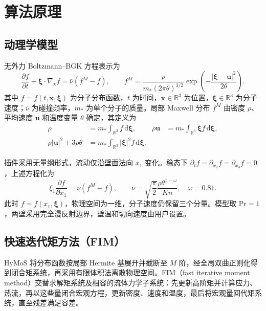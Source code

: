 \documentclass[UTF8,a4paper,11pt,fontset=fandol]{ctexart}
\newcommand{\Kn}{\mathit{Kn}}
\begin{document}
\section{算法原理}
\subsection{动理学模型}
无外力 Boltzmann--BGK 方程表示为
\begin{equation}
\frac{\partial f}{\partial t}
+\boldsymbol\xi\cdot\nabla_{\boldsymbol x}f
=\bar\nu(f^M-f),
\qquad
f^M=\frac{\rho}{m_*(2\pi\theta)^{3/2}}
\exp\!\left(-\frac{|\boldsymbol\xi-\boldsymbol u|^2}{2\theta}\right).
\end{equation}
其中 $f=f(t,\boldsymbol x,\boldsymbol\xi)$ 为分子分布函数，$t$ 为时间，$\boldsymbol x\in\mathbb R^3$ 为位置，$\boldsymbol\xi\in\mathbb R^3$ 为分子速度；$\bar\nu$ 为碰撞频率，$m_*$ 为单个分子的质量。局部 Maxwell 分布 $f^M$ 由密度 $\rho$、平均速度 $\boldsymbol u$ 和温度变量 $\theta$ 确定，其定义为
\begin{equation}
\begin{aligned}
\rho&=m_*\int_{\mathbb R^3}f\,\mathrm d\boldsymbol\xi,
&\rho\boldsymbol u&=m_*\int_{\mathbb R^3}\boldsymbol\xi f\,\mathrm d\boldsymbol\xi,\\
\rho|\boldsymbol u|^2+3\rho\theta
&=m_*\int_{\mathbb R^3}|\boldsymbol\xi|^2f\,\mathrm d\boldsymbol\xi.
\end{aligned}
\end{equation}

插件采用无量纲形式，流动仅沿壁面法向 $x_1$ 变化。稳态下 $\partial_t f=\partial_{x_2}f=\partial_{x_3}f=0$，上述方程化为
\begin{equation}
\xi_1\frac{\partial f}{\partial x_1}=\bar\nu(f^M-f),
\qquad
\bar\nu=\sqrt{\frac{\pi}{2}}\frac{\rho\theta^{1-\omega}}{\Kn},
\quad \omega=0.81.
\end{equation}
此时 $f=f(x_1,\boldsymbol\xi)$，物理空间为一维，分子速度仍保留三个分量。模型取 $\mathrm{Pr}=1$，两壁采用完全漫反射边界，壁温和切向速度由用户设置。

\subsection{快速迭代矩方法（FIM）}
HyMoS 将分布函数按局部 Hermite 基展开并截断至 $M$ 阶，经全局双曲正则化得到闭合矩系统，再采用有限体积法离散物理空间\cite{cai2014,cai2010}。FIM（fast iterative moment method）交替求解矩系统及相容的流体力学子系统：先更新高阶矩并计算应力、热流，再以这些量闭合宏观方程，更新密度、速度和温度，最后将宏观量回代矩系统，直至残差满足容差\cite{li2026,lidoctor2026}。
\end{document}

